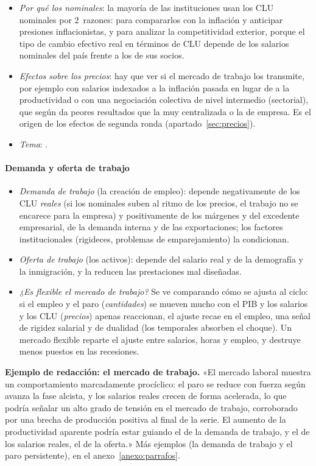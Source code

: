 \documentclass[11pt]{article}
\begin{document}
\begin{itemize}
\item \emph{Por qué los nominales}: la mayoría de las instituciones usan los CLU nominales por 2~razones: para compararlos con la inflación y anticipar presiones inflacionistas, y para analizar la competitividad exterior, porque el tipo de cambio efectivo real en términos de CLU depende de los salarios nominales del país frente a los de sus socios.
\item \emph{Efectos sobre los precios}: hay que ver si el mercado de trabajo los transmite, por ejemplo con salarios indexados a la inflación pasada en lugar de a la productividad o con una negociación colectiva de nivel intermedio (sectorial), que según \textcite{CalmforsDriffill1988} da peores resultados que la muy centralizada o la de empresa. Es el origen de los efectos de segunda ronda (apartado~\ref{sec:precios}).
\item \emph{Tema}:   .
\end{itemize}

\paragraph{Demanda y oferta de trabajo}
\begin{itemize}
\item \emph{Demanda de trabajo} (la creación de empleo): depende negativamente de los CLU \emph{reales} (si los nominales suben al ritmo de los precios, el trabajo no se encarece para la empresa) y positivamente de los márgenes y del excedente empresarial, de la demanda interna y de las exportaciones; los factores institucionales (rigideces, problemas de emparejamiento) la condicionan.
\item \emph{Oferta de trabajo} (los activos): depende del salario real y de la demografía y la inmigración, y la reducen las prestaciones mal diseñadas.
\item \emph{¿Es flexible el mercado de trabajo?} Se ve comparando cómo se ajusta al ciclo: si el empleo y el paro (\emph{cantidades}) se mueven mucho con el PIB y los salarios y los CLU (\emph{precios}) apenas reaccionan, el ajuste recae en el empleo, una señal de rigidez salarial y de dualidad (los temporales absorben el choque). Un mercado flexible reparte el ajuste entre salarios, horas y empleo, y destruye menos puestos en las recesiones.
\end{itemize}

\begin{anotaciones}
\textbf{Ejemplo de redacción: el mercado de trabajo.}
«El mercado laboral muestra un comportamiento marcadamente procíclico: el paro se reduce con fuerza según avanza la fase alcista, y los salarios reales crecen de forma acelerada, lo que podría señalar un alto grado de tensión en el mercado de trabajo, corroborado por una brecha de producción positiva al final de la serie. El aumento de la productividad aparente podría estar guiando el de la demanda de trabajo, y el de los salarios reales, el de la oferta.» Más ejemplos (la demanda de trabajo y el paro persistente), en el anexo~\ref{anexo:parrafos}.
\end{anotaciones}
\end{document}
